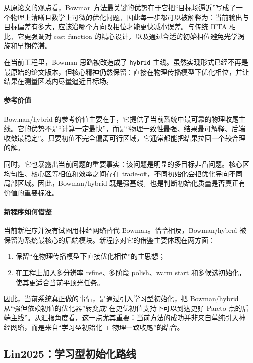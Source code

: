 \documentclass[12pt,a4paper]{ctexart}
\begin{document}
从原论文的观点看，Bowman 方法最关键的优势在于它把“目标场逼近”写成了一个物理上清晰且数学上可微的优化问题，因此每一步都可以被解释为：当前输出与目标偏差有多大，应该沿哪个方向改相位才能更快减小误差。与传统 IFTA 相比，它更强调对 cost function 的精心设计，以及通过合适的初始相位避免光学涡旋和早期停滞。

在当前工程里，Bowman 思路被改造成了 \texttt{hybrid} 主线。虽然实现形式已经不再是最原始的论文版本，但核心精神仍然保留：直接在物理传播模型下优化相位，并让结果在测量区域内尽量逼近目标场。

\paragraph{参考价值}
Bowman/hybrid 的参考价值主要在于，它提供了当前系统中最可靠的物理收尾主线。它的优势不是“计算一定最快”，而是“物理一致性最强、结果最可解释、后端收敛最稳定”。只要初值不完全偏离可行区域，它通常都能把结果拉回一个较合理的解。

同时，它也暴露出当前问题的重要事实：该问题是明显的多目标非凸问题。核心区均匀性、核心区等相位和效率之间存在 trade-off，不同初始化会把优化导向不同局部区域。因此，Bowman/hybrid 既是强基线，也是判断初始化质量是否真正有价值的重要标准。

\paragraph{新程序如何借鉴}
当前新程序并没有试图用神经网络替代 Bowman。恰恰相反，Bowman/hybrid 被保留为系统最核心的后端模块。新程序对它的借鉴主要体现在两方面：
\begin{enumerate}[label=\arabic*.]
    \item 保留“在物理传播模型下直接优化相位”的主思想；
    \item 在工程上加入多分辨率 refine、多阶段 polish、warm start 和多候选初始化，使其更适合当前平顶光任务。
\end{enumerate}

因此，当前系统真正做的事情，是通过引入学习型初始化，把 Bowman/hybrid 从“强但依赖初值的优化器”转变成“在更优初值支持下可以到达更好 Pareto 点的后端主线”。从汇报角度看，这一点尤其重要：当前方法的成功并非来自单纯引入神经网络，而是来自“学习型初始化 + 物理一致收尾”的结合。

\subsection{Lin2025：学习型初始化路线}
\end{document}
